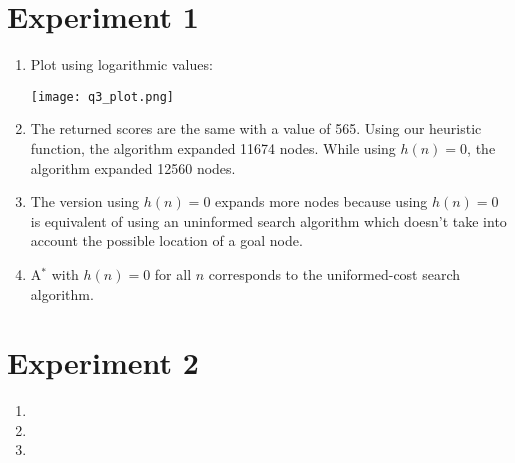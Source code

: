 \documentclass{article}
\begin{document}
\section{Experiment 1}

\begin{enumerate}[label=\alph*.,leftmargin=1.35em]
    \item Plot using logarithmic values:\\
    \begin{center}\texttt{[image: q3\_plot.png]}\end{center}
    \item The returned scores are the same with a value of 565. Using our heuristic function, the algorithm expanded 11674 nodes. While using $h(n)=0$, the algorithm expanded 12560 nodes.
    \item The version using $h(n) = 0$ expands more nodes because using $h(n) = 0$ is equivalent of using an uninformed search algorithm which doesn't take into account the possible location of a goal node.
    \item A$^*$ with $h(n) = 0$ for all $n$ corresponds to the uniformed-cost search algorithm.
\end{enumerate}

\section{Experiment 2}

\begin{enumerate}[label=\alph*.,leftmargin=1.35em]
    \item
    \item
    \item
\end{enumerate}


\end{document}
